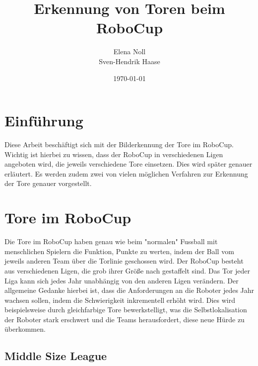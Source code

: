 \documentclass[a4paper,12pt]{article}
\begin{document}
\renewcommand\bibname{Referenzen}
\renewcommand\refname{Referenzen}

\begin{titlepage}
\author{Elena Noll\\
		Sven-Hendrik Haase}
\title{Erkennung von Toren beim RoboCup} 
\date{\today} 
\maketitle
\thispagestyle{empty}
\end{titlepage}

\tableofcontents

\newpage

\section{Einführung}
Diese Arbeit beschäftigt sich mit der Bilderkennung der Tore im RoboCup.
Wichtig ist hierbei zu wissen, dass der RoboCup in verschiedenen Ligen
angeboten wird, die jeweils verschiedene Tore einsetzen. Dies wird später
genauer erläutert. Es werden zudem zwei von vielen möglichen Verfahren zur Erkennung
der Tore genauer vorgestellt.

\section{Tore im RoboCup}
Die Tore im RoboCup haben genau wie beim "normalen" Fussball mit menschlichen
Spielern die Funktion, Punkte zu werten, indem der Ball vom jeweils anderen Team über die
Torlinie geschossen wird.
Der RoboCup besteht aus verschiedenen Ligen, die grob ihrer Größe nach
gestaffelt sind. Das Tor jeder Liga kann sich jedes Jahr unabhängig von den
anderen Ligen verändern. Der allgemeine Gedanke hierbei ist, dass die
Anforderungen an die Roboter jedes Jahr wachsen sollen, indem die Schwierigkeit
inkrementell erhöht wird. Dies wird beispielsweise durch gleichfarbige Tore
bewerkstelligt, was die Selbstlokalisation der Roboter stark erschwert und die Teams herausfordert,
diese neue Hürde zu überkommen.

\subsection{Middle Size League}
\end{document}
